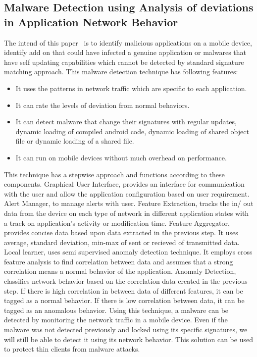 \documentclass[11pt]{article}
\begin{document}
	\subsection{Malware Detection using Analysis of deviations in Application Network Behavior}
	The intend of this paper~\cite{shabtai2014mobile} is to identify malicious applications on a mobile device, identify add on that could have infected a genuine application or malwares that have self updating capabilities which cannot be detected by standard signature matching approach. This malware detection technique has following features:
	\begin{itemize}
		\item It uses the patterns in network traffic which are specific to each application.
		\item It can rate the levels of deviation from normal behaviors.
		\item It can detect malware that change their signatures with regular updates, dynamic loading of compiled android code, dynamic loading of shared object file or dynamic loading of a shared file.
		\item It can run on mobile devices without much overhead on performance.
	\end{itemize}
	This technique has a stepwise approach and functions according to these components. Graphical User Interface, provides an interface for communication with the user and allow the application configuration based on user requirement. Alert Manager, to manage alerts with user. Feature Extraction, tracks the in/ out data from the device on each type of network in different application states with a track on application’s activity or modification time. Feature Aggregator, provides concise data based upon data extracted in the previous step. It uses average, standard deviation, min-max of sent or recieved of transmitted data. Local learner, uses semi supervised anomaly detection technique. It employs cross feature analysis to find correlation between data and assumes that a strong correlation means a normal behavior of the application. Anomaly Detection, classifies network behavior based on the correlation data created in the previous step. If there is high correlation in between data of different features, it can be tagged as a normal behavior. If there is low correlation between data, it can be tagged as an anomalous behavior.
	Using this technique, a malware can be detected by monitoring the network traffic in a mobile device. Even if the malware was not detected previously and locked using its specific signatures, we will still be able to detect it using its network behavior. This solution can be used to protect thin clients from malware attacks.
	
\end{document}
